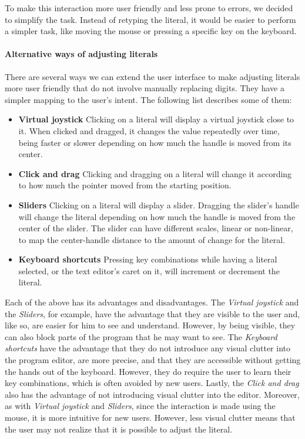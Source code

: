 To make this interaction more user friendly and less prone to errors, we decided to simplify the task.
Instead of retyping the literal, it would be easier to perform a simpler task, like moving the mouse or pressing a specific key on the keyboard.

\paragraph{Alternative ways of adjusting literals}
There are several ways we can extend the user interface to make adjusting literals more user friendly that do not involve manually replacing digits.
They have a simpler mapping to the user's intent.
The following list describes some of them:

\begin{itemize}
  \item {\bf Virtual joystick} Clicking on a literal will display a virtual joystick close to it. When clicked and dragged, it changes the value repeatedly over time, being faster or slower depending on how much the handle is moved from its center.
  \item {\bf Click and drag} Clicking and dragging on a literal will change it according to how much the pointer moved from the starting position.
  \item {\bf Sliders} Clicking on a literal will display a slider. Dragging the slider's handle will change the literal depending on how much the handle is moved from the center of the slider. The slider can have different scales, linear or non-linear, to map the center-handle distance to the amount of change for the literal.
  \item {\bf Keyboard shortcuts} Pressing key combinations while having a literal selected, or the text editor's caret on it, will increment or decrement the literal.
\end{itemize}

Each of the above has its advantages and disadvantages.
The {\it Virtual joystick} and the {\it Sliders}, for example, have the advantage that they are visible to the user and, like so, are easier for him to see and understand.
However, by being visible, they can also block parts of the program that he may want to see.
The {\it Keyboard shortcuts} have the advantage that they do not introduce any visual clutter into the program editor, are more precise, and that they are accessible without getting the hands out of the keyboard.
However, they do require the user to learn their key combinations, which is often avoided by new users.
Lastly, the {\it Click and drag} also has the advantage of not introducing visual clutter into the editor.
Moreover, as with {\it Virtual joystick} and {\it Sliders}, since the interaction is made using the mouse, it is more intuitive for new users.
However, less visual clutter means that the user may not realize that it is possible to adjust the literal.

